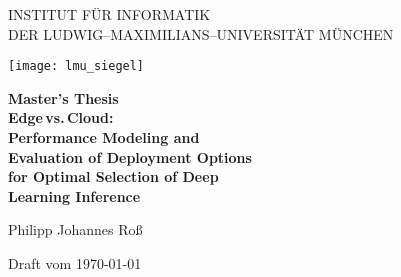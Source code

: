 
\thispagestyle{empty}

\begin{center}

\vspace*{-2cm}

{\Huge INSTITUT F\"UR INFORMATIK\\[1mm]}
DER LUDWIG--MAXIMILIANS--UNIVERSITÄT MÜNCHEN\\

\vspace*{1cm}

\texttt{[image: lmu\_siegel]}

\vspace*{2cm}

{\Large \textbf{Master's Thesis}}\\ %

\vspace{2.0cm}
{\Huge \textbf{Edge\,vs.\,Cloud:}}\\
\vspace*{2.0mm}
{\Huge \textbf{Performance Modeling and}}\\
\vspace*{2.0mm}
{\Huge \textbf{Evaluation of Deployment Options}}\\
 \vspace*{2.0mm}
{\Huge \textbf{for Optimal Selection of Deep}}\\
 \vspace*{2.0mm}
{\Huge \textbf{Learning Inference}}\\
\vspace{1.5cm}

{\LARGE Philipp Johannes Roß} %

\vspace{3cm}
Draft vom \today %

\end{center}

\newpage


\thispagestyle{empty}
\cleardoublepage


\thispagestyle{empty}

